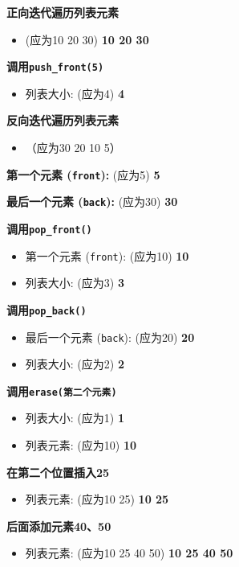 \documentclass{article}
\begin{document}
\textbf{正向迭代遍历列表元素}  
\begin{itemize}  
    \item (应为10 20 30) \textbf{10 20 30}  
\end{itemize}  
  
\textbf{调用\texttt{push\_front(5)}}  
\begin{itemize}  
    \item 列表大小: (应为4) \textbf{4}  
\end{itemize}  
  
\textbf{反向迭代遍历列表元素}  
\begin{itemize}  
    \item （应为30 20 10 5）  
\end{itemize}  
  
\textbf{第一个元素 (\texttt{front}):} (应为5) \textbf{5}  
  
\textbf{最后一个元素 (\texttt{back}):} (应为30) \textbf{30}  
  
\textbf{调用\texttt{pop\_front()}}  
\begin{itemize}  
    \item 第一个元素 (\texttt{front}): (应为10) \textbf{10}  
    \item 列表大小: (应为3) \textbf{3}  
\end{itemize}  
  
\textbf{调用\texttt{pop\_back()}}  
\begin{itemize}  
    \item 最后一个元素 (\texttt{back}): (应为20) \textbf{20}  
    \item 列表大小: (应为2) \textbf{2}  
\end{itemize}  
  
\textbf{调用\texttt{erase(第二个元素)}}  
\begin{itemize}  
    \item 列表大小: (应为1) \textbf{1}  
    \item 列表元素: (应为10) \textbf{10}  
\end{itemize}  
  
\textbf{在第二个位置插入25}  
\begin{itemize}  
    \item 列表元素: (应为10 25) \textbf{10 25}  
\end{itemize}  
  
\textbf{后面添加元素40、50}  
\begin{itemize}  
    \item 列表元素: (应为10 25 40 50) \textbf{10 25 40 50}  
\end{itemize}  
  
\end{document}

